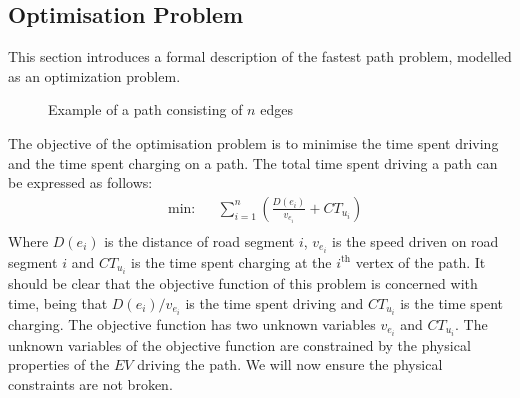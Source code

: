 \subsection{Optimisation Problem}\label{sec:optiprob}
This section introduces a formal description of the fastest path problem, modelled as an optimization problem.

\begin{figure}[h!]
\centering
    \caption{Example of a path consisting of $n$ edges} \label{fig:pathexample}
\end{figure}

The objective of the optimisation problem is to minimise the time spent driving and the time spent charging on a path. The total time spent driving a path can be expressed as follows:
\begin{equation*}
\begin{aligned} &
{\text{min:}}
& & \sum_{i=1}^{n} \left(\frac{D(e_i)}{v_{e_i}} + CT_{u_i} \right)\\
\end{aligned}
\end{equation*}\label{eq:objfunction}
Where $D(e_i)$ is the distance of road segment $i$, $v_{e_i}$ is the speed driven on road segment $i$ and $CT_{u_i}$ is the time spent charging at the $i^{\text{th}}$ vertex of the path. It should be clear that the objective function of this problem is concerned with time, being that \( D(e_i)/v_{e_i} \) is the time spent driving and $CT_{u_i}$ is the time spent charging. The objective function has two unknown variables $v_{e_i}$ and $CT_{u_i}$. The unknown variables of the objective function are constrained by the physical properties of the $EV$ driving the path. We will now ensure the physical constraints are not broken.

